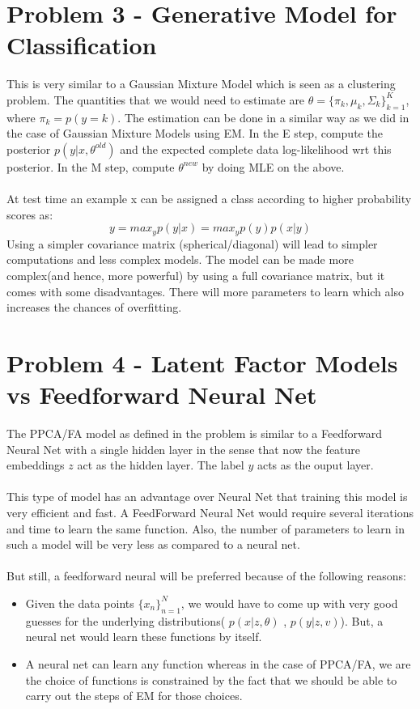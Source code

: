 \documentclass{article}
\begin{document}
\section{Problem 3 - Generative Model for Classification}
This is very similar to a Gaussian Mixture Model which is seen as a clustering problem. The quantities that we would need to estimate are $\theta = \{\pi_k,\mu_k,\Sigma_k\}_{k=1}^K$, where $\pi_k = p(y = k)$. The estimation can be done in a similar way as we did in the case of Gaussian Mixture Models using EM. In the E step, compute the posterior $p(y|x,\theta^{old})$ and the expected complete data log-likelihood wrt this posterior. In the M step, compute $\theta^{new}$ by doing MLE on the above. \\ \\
At test time an example x can be assigned a class according to higher probability scores as:
$$y = max_{y}p(y|x) = max_{y}p(y)p(x|y)$$
Using a simpler covariance matrix (spherical/diagonal) will lead to simpler computations and less complex models. The model can be made more complex(and hence, more powerful) by using a full covariance matrix, but it comes with some disadvantages. There will more parameters to learn which also increases the chances of overfitting.

\section{Problem 4 - Latent Factor Models vs Feedforward Neural Net}
The PPCA/FA model as defined in the problem is similar to a Feedforward Neural Net with a single hidden layer in the sense that now the feature embeddings $z$ act as the hidden layer. The label $y$ acts as the ouput layer. \\ \\
This type of model has an advantage over Neural Net that training this model is very efficient and fast. A FeedForward Neural Net would require several iterations and time to learn the same function. Also, the number of parameters to learn in such a model will be very less as compared to a neural net.\\ \\
But still, a feedforward neural will be preferred because of the following reasons:
\begin{itemize}
\item Given the data points $\{x_n\}_{n=1}^N$, we would have to come up with very good guesses for the underlying distributions( $p(x|z,\theta)$ , $p(y|z,v)$). But, a neural net would learn these functions by itself.
\item A neural net can learn any function whereas in the case of PPCA/FA, we are the choice of functions is constrained by the fact that we should be able to carry out the steps of EM for those choices.
\end{itemize}
\end{document}
